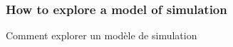 





\subsubsection{How to explore a model of simulation}{Comment explorer un modèle de simulation}

